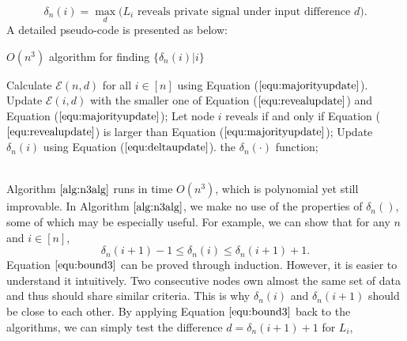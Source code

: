 \documentclass[a4paper,UKenglish]{lipics}
\theoremstyle{definition}
\newcommand{\hide}[1]{} %
\begin{document}
\begin{equation}
\label{equ:deltaupdate}
	\delta_n(i)
	 = 
	 \max_{d} \Big( \text{$L_i$ reveals private signal under input difference $d$} \Big).
\end{equation}
A detailed pseudo-code is presented as below:
\begin{algorithm}[htb]
\caption{$O(n^3)$ algorithm for finding $\{\delta_n(i)|i\}$} \label{alg:n3alg}
\begin{algorithmic}[1]
\hide{
\REQUIRE ~~\\
	The set of positive samples for current batch, $P_n$;\\
	The set of unlabeled samples for current batch, $U_n$;\\
	Ensemble of classifiers on former batches, $E_{n-1}$;\\
\ENSURE ~~\\              
	Ensemble of classifiers on the current batch, $E_n$;
	}
\STATE Calculate $\mathcal{E}(n,d)$ for all $i\in [n]$ using Equation ($\ref{equ:majorityupdate}$). 
	\STATE Update $\mathcal{E}(i,d)$ with the smaller one of Equation ($\ref{equ:revealupdate}$) and Equation ($\ref{equ:majorityupdate}$);
	\STATE Let node $i$ reveals if and only if Equation ($\ref{equ:revealupdate}$) is larger than Equation ($\ref{equ:majorityupdate}$);
\ENDFOR
{}
	\STATE Update $\delta_n(i)$ using Equation ($\ref{equ:deltaupdate}$).
\ENDFOR
\RETURN the $\delta_n(\cdot)$ function;

\end{algorithmic}
\end{algorithm}
\\
Algorithm $\ref{alg:n3alg}$ runs in time $O(n^3)$, which is polynomial yet still improvable. 
In Algorithm $\ref{alg:n3alg}$, we make no use of the properties of $\delta_n()$,
	some of which may be especially useful.
For example, we can show that for any $n$ and $i\in[n]$,
\begin{equation}
\label{equ:bound3}
\delta_n(i+1)-1\le \delta_n(i)\le \delta_n(i+1)+1.
\end{equation}
Equation $\ref{equ:bound3}$ can be proved through induction.
However, it is easier to understand it intuitively.
Two consecutive nodes own almost the same set of data and thus should share similar criteria.
This is why $\delta_n(i)$ and $\delta_n(i+1)$ should be close to each other.  
By applying Equation $\eqref{equ:bound3}$ back to the algorithms, 
	we can simply test the difference $d = \delta_n(i+1)+1$ for $L_i$,
\end{document}
